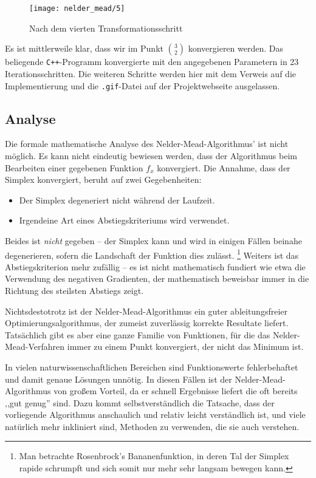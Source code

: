 \documentclass[naustrian]{article}
\begin{document}
{\begin{figure}[H]
    \centering
    \texttt{[image: nelder\_mead/5]}
    \caption{Nach dem vierten Transformationsschritt}
\end{figure}

Es ist mittlerweile klar, dass wir im Punkt $\binom{3}{2}$ konvergieren werden.
Das beliegende {\tt C++}-Programm konvergierte mit den angegebenen Parametern
in 23 Iterationsschritten. Die weiteren Schritte werden hier mit dem Verweis
auf die Implementierung und die {\tt .gif}-Datei auf der Projektwebseite
ausgelassen.

\subsection{Analyse}

Die formale mathematische Analyse des Nelder-Mead-Algorithmus' ist nicht möglich.
Es kann nicht eindeutig bewiesen werden, dass der Algorithmus beim Bearbeiten einer gegebenen
Funktion $f_x$ konvergiert. Die Annahme, dass der Simplex konvergiert, beruht auf zwei
Gegebenheiten:

\begin{itemize}
\item Der Simplex degeneriert nicht während der Laufzeit.
\item Irgendeine Art eines Abstiegskriteriums wird verwendet.
\end{itemize}

Beides ist \emph{nicht} gegeben -- der Simplex kann und wird in einigen Fällen
beinahe degenerieren, sofern die Landschaft der Funktion dies
zulässt.
\footnote{Man betrachte Rosenbrock's Bananenfunktion, in deren Tal der Simplex
    rapide schrumpft und sich somit nur mehr sehr langsam bewegen
kann.} Weiters ist das Abstiegskriterion mehr zufällig -- es ist nicht mathematisch
fundiert wie etwa die Verwendung des negativen Gradienten, der mathematisch beweisbar
immer in die Richtung des steilsten Abstiegs zeigt. ~\cite{nelder-mead-scholarpedia}

Nichtsdestotrotz ist der Nelder-Mead-Algorithmus ein guter ableitungsfreier
Optimierungsalgorithmus, der zumeist zuverlässig korrekte Resultate liefert.
Tatsächlich gibt es aber eine ganze Familie von Funktionen, für die das Nelder-Mead-Verfahren
immer zu einem Punkt konvergiert, der nicht das Minimum ist.~\cite{nelder-mead-convergence}

In vielen naturwissenschaftlichen Bereichen sind Funktionswerte fehlerbehaftet und damit
genaue Lösungen unnötig. In diesen Fällen ist der Nelder-Mead-Algorithmus von großem
Vorteil, da er schnell Ergebnisse liefert die oft bereits ,,gut genug'' sind.
Dazu kommt selbstverständlich die Tatsache, dass der vorliegende Algorithmus anschaulich
und relativ leicht verständlich ist, und viele natürlich mehr inkliniert sind, Methoden
zu verwenden, die sie auch verstehen.

}
\end{document}
